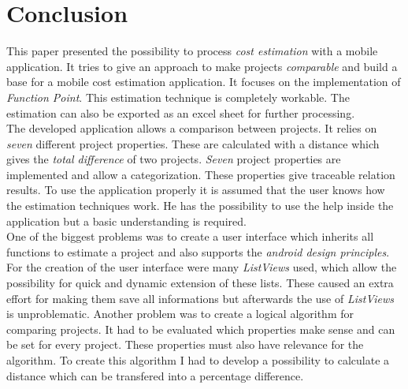 \chapter{Conclusion}

This paper presented the possibility to process \textit{cost estimation} with a mobile application. It tries to give an approach to make projects \textit{comparable} and build a base for a mobile cost estimation application. It focuses on the implementation of \textit{Function Point}. This estimation technique is completely workable. The estimation can also be exported as an excel sheet for further processing.\\
The developed application allows a comparison between projects. It relies on \textit{seven} different project properties. These are calculated with a distance which gives the \textit{total difference} of two projects. \textit{Seven} project properties are implemented and allow a categorization. These properties give traceable relation results. To use the application properly it is assumed that the user knows how the estimation techniques work. He has the possibility to use the help inside the application but a basic understanding is required.\\
One of the biggest problems was to create a user interface which inherits all functions to estimate a project and also supports the \textit{android design principles}. For the creation of the user interface were many \textit{ListViews} used, which allow the possibility for quick and dynamic extension of these lists. These caused an extra effort for making them save all informations but afterwards the use of \textit{ListViews} is unproblematic. Another problem was to create a logical algorithm for comparing projects. It had to be evaluated which properties make sense and can be set for every project. These properties must also have relevance for the algorithm. To create this algorithm I had to develop a possibility to calculate a distance which can be transfered into a percentage difference. \\
